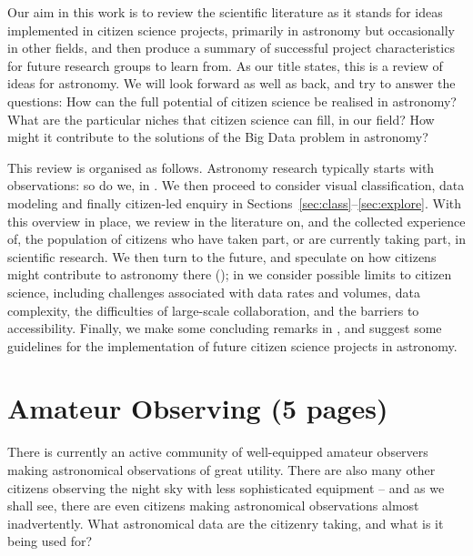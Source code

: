 \documentclass{ar2e}
\begin{document}
Our aim in this work is to review the scientific literature as it stands for
ideas implemented in citizen science projects, primarily in astronomy but
occasionally in other fields, and then produce a summary of successful project
characteristics for future research groups to learn from.  As our title states,
this is a review of ideas for astronomy. We will look forward as well as back,
and try to answer the questions: How can the full potential of citizen science
be realised in astronomy? What are the particular niches that citizen science
can fill, in our field? How might it contribute to the solutions of the Big Data
problem in astronomy?


This review is organised as follows. Astronomy research typically starts
with observations: so do we, in . We then proceed to consider 
visual classification, data modeling and finally citizen-led enquiry in 
Sections~\ref{sec:class}--\ref{sec:explore}. With this overview in place, we
review in  the literature on, and the collected experience of,
the population of citizens who have taken part, or are currently taking part, in
scientific research. We then turn to the future, and speculate on how citizens
might contribute to astronomy there (); in  
we consider possible limits to citizen science, including challenges associated
with data rates and volumes, data complexity, the difficulties of large-scale
collaboration, and the barriers to accessibility. Finally, we make some
concluding remarks in , and suggest some guidelines for
the implementation of future citizen science projects in astronomy.



\section{Amateur Observing (5 pages)}
\label{sec:obs}

There is currently an active community of well-equipped amateur observers making
astronomical observations of great utility. There are also many other citizens
observing the night sky with less sophisticated equipment -- and as we shall
see, there are even citizens making  astronomical observations almost
inadvertently. What astronomical data are the citizenry taking, and what is it
being used for?


\end{document}
